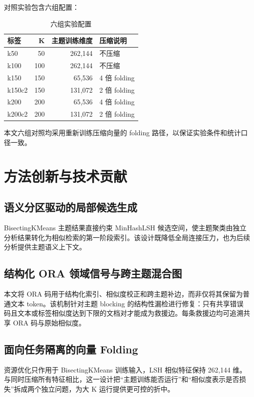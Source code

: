 \documentclass[a4paper,UTF8,zihao=5,fontset=windows]{ctexart}
\begin{document}
对照实验包含六组配置：

\begin{table}[H]
\centering
\caption{六组实验配置}
\begin{tabular}{lrrl}
\toprule
标签 & K & 主题训练维度 & 压缩说明 \\
\midrule
k50 & 50 & 262,144 & 不压缩 \\
k100 & 100 & 262,144 & 不压缩 \\
k150 & 150 & 65,536 & 4 倍 folding \\
k150c2 & 150 & 131,072 & 2 倍 folding \\
k200 & 200 & 65,536 & 4 倍 folding \\
k200c2 & 200 & 131,072 & 2 倍 folding \\
\bottomrule
\end{tabular}
\end{table}

本文六组对照均采用重新训练压缩向量的 folding 路径，以保证实验条件和统计口径一致。

\section{方法创新与技术贡献}

\subsection{语义分区驱动的局部候选生成}

BisectingKMeans 主题结果直接约束 MinHashLSH 候选空间，使主题聚类由独立分析结果转化为相似检索的第一阶段索引。该设计既降低全局连接压力，也为后续分析提供主题语义上下文。

\subsection{结构化 ORA 领域信号与跨主题混合图}

本文将 ORA 码用于结构化索引、相似度校正和跨主题补边，而非仅将其保留为普通文本 token。该机制针对主题 blocking 的结构性漏检进行修复：只有共享错误码且文本或标签相似度达到下限的文档对才能成为救援边。每条救援边均可追溯共享 ORA 码与原始相似度。

\subsection{面向任务隔离的向量 Folding}

资源优化只作用于 BisectingKMeans 训练输入，LSH 相似特征保持 262,144 维。与同时压缩所有特征相比，这一设计把“主题训练能否运行”和“相似度表示是否损失”拆成两个独立问题，为大 K 运行提供更可控的折中。
\end{document}
